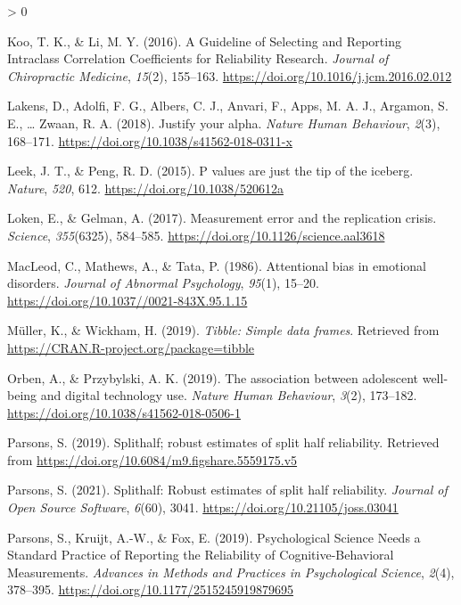 \documentclass[
  english,
  man,floatsintext]{apa6}
\newlength{\cslhangindent}
\newenvironment{CSLReferences}[2] %
 {%
  \setlength{\parindent}{0pt}
  \ifodd #1 \everypar{\setlength{\hangindent}{\cslhangindent}}\ignorespaces\fi
  \ifnum #2 > 0
  \setlength{\parskip}{#2\baselineskip}
  \fi
 }%
 {}
\begin{document}
\begin{CSLReferences}{1}{0}
\leavevmode\hypertarget{ref-koo_guideline_2016}{}%
Koo, T. K., \& Li, M. Y. (2016). A {Guideline} of {Selecting} and {Reporting} {Intraclass} {Correlation} {Coefficients} for {Reliability} {Research}. \emph{Journal of Chiropractic Medicine}, \emph{15}(2), 155--163. \url{https://doi.org/10.1016/j.jcm.2016.02.012}

\leavevmode\hypertarget{ref-lakens_justify_2018}{}%
Lakens, D., Adolfi, F. G., Albers, C. J., Anvari, F., Apps, M. A. J., Argamon, S. E., \ldots{} Zwaan, R. A. (2018). Justify your alpha. \emph{Nature Human Behaviour}, \emph{2}(3), 168--171. \url{https://doi.org/10.1038/s41562-018-0311-x}

\leavevmode\hypertarget{ref-leek_p_2015}{}%
Leek, J. T., \& Peng, R. D. (2015). P values are just the tip of the iceberg. \emph{Nature}, \emph{520}, 612. \url{https://doi.org/10.1038/520612a}

\leavevmode\hypertarget{ref-loken_measurement_2017}{}%
Loken, E., \& Gelman, A. (2017). Measurement error and the replication crisis. \emph{Science}, \emph{355}(6325), 584--585. \url{https://doi.org/10.1126/science.aal3618}

\leavevmode\hypertarget{ref-MacLeod1986}{}%
MacLeod, C., Mathews, A., \& Tata, P. (1986). Attentional bias in emotional disorders. \emph{Journal of Abnormal Psychology}, \emph{95}(1), 15--20. \url{https://doi.org/10.1037//0021-843X.95.1.15}

\leavevmode\hypertarget{ref-R-tibble}{}%
Müller, K., \& Wickham, H. (2019). \emph{Tibble: Simple data frames}. Retrieved from \url{https://CRAN.R-project.org/package=tibble}

\leavevmode\hypertarget{ref-orben_association_2019}{}%
Orben, A., \& Przybylski, A. K. (2019). The association between adolescent well-being and digital technology use. \emph{Nature Human Behaviour}, \emph{3}(2), 173--182. \url{https://doi.org/10.1038/s41562-018-0506-1}

\leavevmode\hypertarget{ref-R-splithalf}{}%
Parsons, S. (2019). Splithalf; robust estimates of split half reliability. Retrieved from \url{https://doi.org/10.6084/m9.figshare.5559175.v5}

\leavevmode\hypertarget{ref-parsons_splithalf_2021}{}%
Parsons, S. (2021). Splithalf: Robust estimates of split half reliability. \emph{Journal of Open Source Software}, \emph{6}(60), 3041. \url{https://doi.org/10.21105/joss.03041}

\leavevmode\hypertarget{ref-parsons_psychological_2019}{}%
Parsons, S., Kruijt, A.-W., \& Fox, E. (2019). Psychological {Science} {Needs} a {Standard} {Practice} of {Reporting} the {Reliability} of {Cognitive}-{Behavioral} {Measurements}. \emph{Advances in Methods and Practices in Psychological Science}, \emph{2}(4), 378--395. \url{https://doi.org/10.1177/2515245919879695}


\end{CSLReferences}
\end{document}
